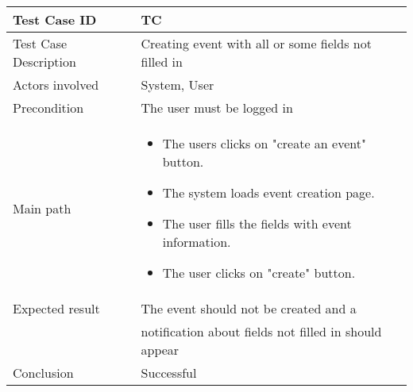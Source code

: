 \begin{center} \begin{tabular}{|l|l|}
  \hline
  Test Case ID & TC \z\\
  \hline
  Test Case Description & Creating event with all or some fields not filled in\\
  \hline
  Actors involved & System, User\\
   \hline
  Precondition & The user must be logged in\\
  \hline
  Main path &   \begin{minipage}{5in}
    \vskip 4pt
            \begin{itemize}
              \item The users clicks on "create an event" button.
              \item The system loads event creation page.
              \item The user fills the fields with event information.
              \item The user clicks on "create" button.
            \end{itemize}
    \vskip 4pt
  \end{minipage}  \\
  \hline
  Expected result & The event should not be created and a\\
  & notification about fields not filled in should appear\\
  \hline
  Conclusion & Successful\\
  \hline
\end{tabular} \end{center}


